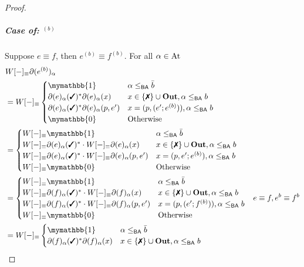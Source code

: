 \documentclass[a4paper,UKenglish,cleveref, autoref, thm-restate]{lipics-v2021}
\newcommand{\cmark}{\text{\ding{51}}}
\newcommand{\xmark}{\text{\ding{55}}}
\newcommand{\Out}{\textbf{\upshape{Out}}}
\newcommand{\At}{\text{\upshape{At}}}
\newcommand{\BA}{\textsf{BA}}
\newcommand{\bskip}{\mymathbb{1}}
\newcommand{\babort}{\mymathbb{0}}
\theoremstyle{plain}\newtheoremrep{thm}{Theorem}[section]
\begin{document}
\begin{toappendix}
\begin{proof}
			\subparagraph*{Case of: $^{(b)}$}
			Suppose $e\equiv f$, then $e^{(b)} \equiv f^{(b)}$. For all $\alpha \in \At$ 
			\begin{align*}
				&W[-]_\equiv\partial (e^{(b)})_\alpha \\ 
				&= W[-]_\equiv \begin{cases}
					\bskip & \alpha \leq_{\BA} \bar b\\
					\partial(e)_\alpha(\cmark)^{*}\partial(e)_\alpha(x)& x\in \{\xmark\} \cup \Out, \alpha \leq_{\BA} b\\
					\partial(e)_\alpha(\cmark)^{*}\partial(e)_\alpha(p, e^\prime)& x=(p, (e^\prime;e^{(b)})), \alpha \leq_{\BA} b\\
					\babort& \text{Otherwise}\\
				\end{cases}\\
				&= \begin{cases}
					W[-]_\equiv\bskip & \alpha \leq_{\BA} \bar b\\
					W[-]_\equiv\partial(e)_\alpha(\cmark)^{*}\cdot W[-]_\equiv\partial(e)_\alpha(x)& x\in \{\xmark\} \cup \Out, \alpha \leq_{\BA} b\\
					W[-]_\equiv\partial(e)_\alpha(\cmark)^{*}\cdot W[-]_\equiv\partial(e)_\alpha(p, e^\prime)& x=(p, e^\prime;e^{(b)}), \alpha \leq_{\BA} b\\
					W[-]_\equiv\babort& \text{Otherwise}\\
				\end{cases} & \\
				&= \begin{cases}
					W[-]_\equiv\bskip & \alpha \leq_{\BA} \bar b\\
					W[-]_\equiv\partial(f)_\alpha(\cmark)^{*}\cdot W[-]_\equiv\partial(f)_\alpha(x)& x\in \{\xmark\} \cup \Out, \alpha \leq_{\BA} b\\
					W[-]_\equiv\partial(f)_\alpha(\cmark)^{*}\cdot W[-]_\equiv\partial(f)_\alpha(p, e^\prime)& x=(p, (e^\prime;f^{(b)})), \alpha \leq_{\BA} b\\
					W[-]_\equiv\babort& \text{Otherwise}\\
				\end{cases} & e \equiv f, e^b \equiv f^b\\
				&= W[-]_\equiv\begin{cases}
					\bskip & \alpha \leq_{\BA} \bar b\\
					\partial(f)_\alpha(\cmark)^{*}\partial(f)_\alpha(x)& x\in \{\xmark\} \cup \Out, \alpha \leq_{\BA} b\\

\end{cases}
\end{align*}
\end{proof}
\end{toappendix}
\end{document}
